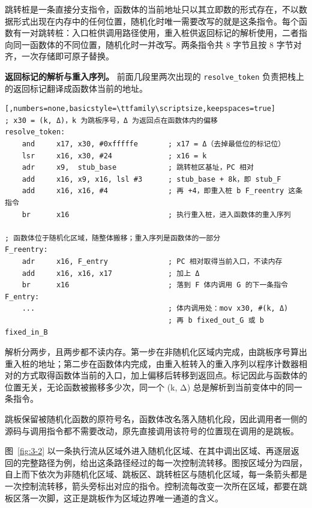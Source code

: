 跳转桩是一条直接分支指令，函数体的当前地址只以其立即数的形式存在，不以数据形式出现在内存中的任何位置，随机化时唯一需要改写的就是这条指令。每个函数有一对跳转桩：入口桩供调用路径使用，重入桩供返回标记的解析使用，二者指向同一函数体的不同位置，随机化时一并改写。两条指令共 8 字节且按 8 字节对齐，一次存储即可原子替换。

\textbf{返回标记的解析与重入序列。} 前面几段里两次出现的 \lstinline[breaklines=false]@resolve_token@ 负责把栈上的返回标记翻译成函数体当前的地址。

\begin{lstlisting}[,numbers=none,basicstyle=\ttfamily\scriptsize,keepspaces=true]
; x30 = (k, Δ)，k 为跳板序号，Δ 为返回点在函数体内的偏移
resolve_token:
    and     x17, x30, #0xfffffe       ; x17 = Δ（去掉最低位的标记位）
    lsr     x16, x30, #24             ; x16 = k
    adr     x9,  stub_base            ; 跳转桩区基址，PC 相对
    add     x16, x9, x16, lsl #3      ; stub_base + 8k，即 stub_F
    add     x16, x16, #4              ; 再 +4，即重入桩 b F_reentry 这条指令
    br      x16                       ; 执行重入桩，进入函数体的重入序列

; 函数体位于随机化区域，随整体搬移；重入序列是函数体的一部分
F_reentry:
    adr     x16, F_entry              ; PC 相对取得当前入口，不读内存
    add     x16, x16, x17             ; 加上 Δ
    br      x16                       ; 落到 F 体内调用 G 的下一条指令
F_entry:
    ...                               ; 体内调用处：mov x30, #(k, Δ)
                                      ; 再 b fixed_out_G 或 b fixed_in_B
\end{lstlisting}

解析分两步，且两步都不读内存。第一步在非随机化区域内完成，由跳板序号算出重入桩的地址；第二步在函数体内完成，由重入桩转入的重入序列以程序计数器相对的方式取得函数体当前的入口，加上偏移后转移到返回点。标记因此与函数体的位置无关，无论函数被搬移多少次，同一个 (k, Δ) 总是解析到当前变体中的同一条指令。

跳板保留被随机化函数的原符号名，函数体改名落入随机化段，因此调用者一侧的源码与调用指令都不需要改动，原先直接调用该符号的位置现在调用的是跳板。

图~\ref{fig:3-2} 以一条执行流从区域外进入随机化区域、在其中调出区域、再逐层返回的完整路径为例，给出这条路径经过的每一次控制流转移。图按区域分为四层，自上而下依次为非随机化区域、跳板区、跳转桩区与随机化区域，每一条箭头都是一次控制流转移，箭头旁标出对应的指令。控制流每改变一次所在区域，都要在跳板区落一次脚，这正是跳板作为区域边界唯一通道的含义。

